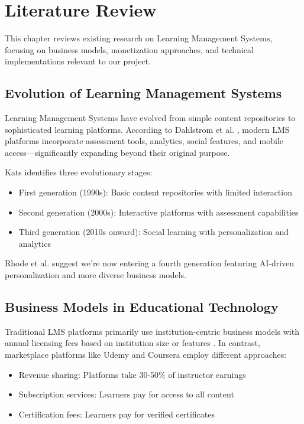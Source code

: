 \section{Literature Review}

This chapter reviews existing research on Learning Management Systems, focusing on business models, monetization approaches, and technical implementations relevant to our project.

\subsection{Evolution of Learning Management Systems}

Learning Management Systems have evolved from simple content repositories to sophisticated learning platforms. According to Dahlstrom et al. \cite{dahlstrom2014}, modern LMS platforms incorporate assessment tools, analytics, social features, and mobile access—significantly expanding beyond their original purpose.

Kats \cite{kats2013} identifies three evolutionary stages:
\begin{itemize}
    \item First generation (1990s): Basic content repositories with limited interaction
    \item Second generation (2000s): Interactive platforms with assessment capabilities
    \item Third generation (2010s onward): Social learning with personalization and analytics
\end{itemize}

Rhode et al. \cite{rhode2017} suggest we're now entering a fourth generation featuring AI-driven personalization and more diverse business models.

\subsection{Business Models in Educational Technology}

Traditional LMS platforms primarily use institution-centric business models with annual licensing fees based on institution size or features \cite{lieberman2018}. In contrast, marketplace platforms like Udemy and Coursera employ different approaches:

\begin{itemize}
    \item Revenue sharing: Platforms take 30-50\% of instructor earnings
    \item Subscription services: Learners pay for access to all content
    \item Certification fees: Learners pay for verified certificates
\end{itemize}

